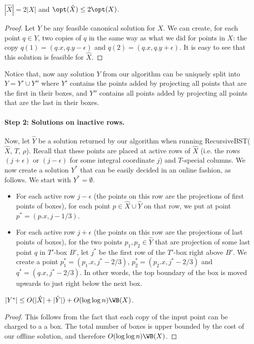 \begin{observation}
$|\hat{X}| = 2|X|$ and $\opt(\hat{X}) \leq 2 \opt(X)$. 
\end{observation} 
\begin{proof}
Let $Y$ be any feasible canonical solution for $X$. 
We can create, for each point $q \in Y$, two copies of $q$ in the same way as what we did for points in $X$: the copy $q(1) = (q.x, q.y- \epsilon)$ and $q(2) = (q.x, q.y+\epsilon)$. 
It is easy to see that this solution is feasible for $\hat{X}$.  
\end{proof} 
 
%
Notice that, now any solution $Y$ from our algorithm can be uniquely split into $Y = Y' \cup Y''$ where $Y'$ contains the points added by projecting all points that are the first in their boxes, and $Y''$ contains all points added by projecting all points that are the last in their boxes.
 

\paragraph*{Step 2: Solutions on inactive rows.} 
Now, let $\hat{Y}$ be a solution returned by our algorithm when running {\sc RecursiveBST}($\hat{X}$, $T$, $\rho$). 
Recall that these points are placed at active rows of $\hat{X}$ (i.e. the rows $(j+\epsilon)$ or $(j-\epsilon)$ for some integral coordinate $j$) and $T$-special columns. 
We now create a solution $Y^*$ that can be easily decided in an online fashion, as follows. We start with $Y^* = \emptyset$. 

\begin{itemize}
\item For each active row $j - \epsilon$ (the points on this row are the projections of first points of boxes), for each point $p \in \hat{X} \cup \hat{Y}$ on that row, we put at point $p^* = (p.x, j-1/3)$.  


\item For each active row $j+\epsilon$ (the points on this row are the projections of last points of boxes), for the two points $p_1, p_2 \in \hat{Y}$ that are projection of some last point $q$ in $T'$-box $B'$, let $j^*$ be the first row of the $T'$-box right above $B'$. We create a point $p^*_1 = (p_1.x, j^* - 2/3)$, $p^*_2 = (p_2.x, j^* - 2/3)$ and $q^* = (q.x, j^* - 2/3)$.
In other words, the top boundary of the box is moved upwards to just right below the next box.  
%
\end{itemize}  
%
%
  

\begin{lemma} 
$|Y^*| \leq O(|\hat{X}| + |\hat{Y}|) + O(\log \log n) \WB(X)$.   
\end{lemma} 
\begin{proof}
This follows from the fact that each copy of the input point can be charged to a a box. 
The total number of boxes is upper bounded by the cost of our offline solution, and therefore $O(\log \log n) \WB(X)$. 
\end{proof} 



